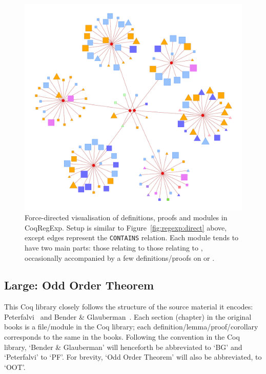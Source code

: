 \begin{figure}[tp]
\centering
\includegraphics[height=0.3\textheight]{img/regexp/module.png}
\caption{Force-directed visualisation of definitions, proofs and modules in
  CoqRegExp. Setup is similar to Figure~\ref{fig:regexp:direct} above, except
  edges represent the \texttt{CONTAINS} relation. Each module tends to have two
  main parts: those relating to  those relating to
  , occasionally accompanied by a few
  definitions/proofs on  or .}\label{fig:regexp:module}
\end{figure}

\subsection{Large: Odd Order Theorem}

This Coq library closely follows the structure of the source material it
encodes: Peterfalvi~\cite{peterfalvi2000oot} and Bender \&
Glauberman~\cite{bender1994oot}. Each section (chapter) in the original books
is a file/module in the Coq library; each definition/lemma/proof/corollary
corresponds to the same in the books. Following the convention in the Coq
library, `Bender \& Glauberman' will henceforth be abbreviated to `BG' and
`Peterfalvi' to `PF'. For brevity, `Odd Order Theorem' will also be
abbreviated, to `OOT'.

